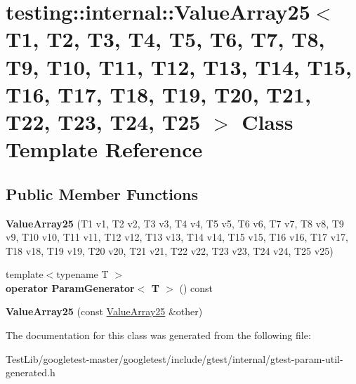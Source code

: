 \hypertarget{classtesting_1_1internal_1_1ValueArray25}{}\section{testing\+:\+:internal\+:\+:Value\+Array25$<$ T1, T2, T3, T4, T5, T6, T7, T8, T9, T10, T11, T12, T13, T14, T15, T16, T17, T18, T19, T20, T21, T22, T23, T24, T25 $>$ Class Template Reference}
\label{classtesting_1_1internal_1_1ValueArray25}
\subsection*{Public Member Functions}
\begin{DoxyCompactItemize}
\item 
\mbox{\label{classtesting_1_1internal_1_1ValueArray25_a8e4f816b4e038c6851fb66066430b226}} 
{\bfseries Value\+Array25} (T1 v1, T2 v2, T3 v3, T4 v4, T5 v5, T6 v6, T7 v7, T8 v8, T9 v9, T10 v10, T11 v11, T12 v12, T13 v13, T14 v14, T15 v15, T16 v16, T17 v17, T18 v18, T19 v19, T20 v20, T21 v21, T22 v22, T23 v23, T24 v24, T25 v25)
\item 
\mbox{\label{classtesting_1_1internal_1_1ValueArray25_ad861f628c2490518a2f2cc18fd709607}} 
{\footnotesize template$<$typename T $>$ }\\{\bfseries operator Param\+Generator$<$ T $>$} () const
\item 
\mbox{\label{classtesting_1_1internal_1_1ValueArray25_a38557aeef2acf50afd6fa6f10f33a99c}} 
{\bfseries Value\+Array25} (const \hyperlink{classtesting_1_1internal_1_1ValueArray25}{Value\+Array25} \&other)
\end{DoxyCompactItemize}


The documentation for this class was generated from the following file\+:\begin{DoxyCompactItemize}
\item 
Test\+Lib/googletest-\/master/googletest/include/gtest/internal/gtest-\/param-\/util-\/generated.\+h\end{DoxyCompactItemize}
